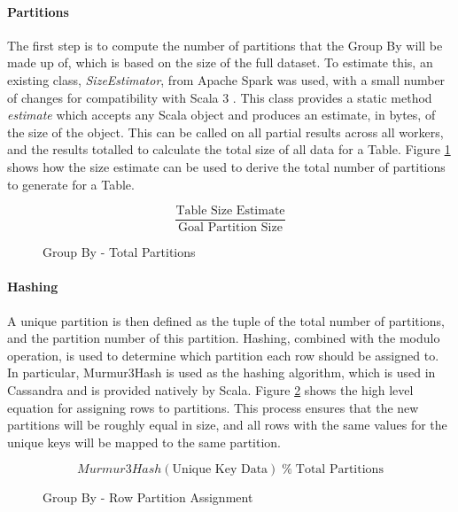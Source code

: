 \paragraph{Partitions}
The first step is to compute the number of partitions that the Group By will be made up of, which is based on the size of the full dataset. To estimate this, an existing class, \textit{SizeEstimator}, from Apache Spark was used, with a small number of changes for compatibility with Scala 3 . This class provides a static method \textit{estimate} which accepts any Scala object and produces an estimate, in bytes, of the size of the object. This can be called on all partial results across all workers, and the results totalled to calculate the total size of all data for a Table. Figure \ref{fig:group-by-num-partitions} shows how the size estimate can be used to derive the total number of partitions to generate for a Table.

\begin{figure}[h]
	\centering
	\[ \frac{\text{Table Size Estimate}}{\text{Goal Partition Size}} \]
	\caption{Group By - Total Partitions}
	\label{fig:group-by-num-partitions}
\end{figure}



\paragraph{Hashing} 
A unique partition is then defined as the tuple of the total number of partitions, and the partition number of this partition. Hashing, combined with the modulo operation, is used to determine which partition each row should be assigned to. In particular, Murmur3Hash is used as the hashing algorithm, which is used in Cassandra and is provided natively by Scala. Figure \ref{fig:group-by-partition-assign} shows the high level equation for assigning rows to partitions. This process ensures that the new partitions will be roughly equal in size, and all rows with the same values for the unique keys will be mapped to the same partition.

\begin{figure}[h]
	\centering
	\[ Murmur3Hash(\text{Unique Key Data}) \; \%  \; \text{Total Partitions} \]
	\caption{Group By - Row Partition Assignment}
	\label{fig:group-by-partition-assign}
\end{figure} 

